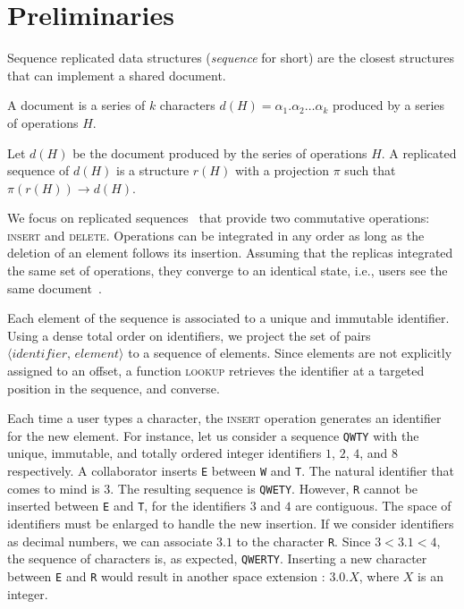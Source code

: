 
\section{Preliminaries}
\label{sec:preliminaries}

Sequence replicated data structures (\emph{sequence} for short) are the closest
structures that can implement a shared document. 

\begin{definition}[Document]
  A document is a series of $k$ characters
  $d(H) = \alpha_1.\alpha_2\ldots \alpha_k$ produced by a series of operations
  $H$.
\end{definition}

\begin{definition}
  Let $d(H)$ be the document produced by the series of operations $H$. A replicated
  sequence of $d(H)$ is a structure $r(H)$ with a projection $\pi$ such that
  $\pi(r(H)) \rightarrow d(H)$.
\end{definition}

We focus on replicated sequences~\cite{shapiro2011comprehensive,
  shapiro2011conflict} that provide two commutative operations:
\textsc{insert} and \textsc{delete}. Operations can be integrated in
any order as long as the deletion of an element follows its
insertion. Assuming that the replicas integrated the same set of
operations, they converge to an identical state, i.e., users see the
same document~\cite{shapiro2011conflict}.

\noindent Each element of the sequence is associated to a unique and immutable
identifier. Using a dense total order on identifiers, we project the set of
pairs $\langle identifier,\, element \rangle$ to a sequence of elements. Since
elements are not explicitly assigned to an offset, a function \textsc{lookup}
retrieves the identifier at a targeted position in the sequence, and converse.

Each time a user types a character, the \textsc{insert} operation generates an
identifier for the new element.  For instance, let us consider a sequence
\texttt{QWTY} with the unique, immutable, and totally ordered integer
identifiers $1$, $2$, $4$, and $8$ respectively. A collaborator inserts
\texttt{E} between \texttt{W} and \texttt{T}. The natural identifier that comes
to mind is $3$. The resulting sequence is \texttt{QWETY}. However, \texttt{R}
cannot be inserted between \texttt{E} and \texttt{T}, for the identifiers $3$
and $4$ are contiguous. The space of identifiers must be enlarged to handle the
new insertion. If we consider identifiers as decimal numbers, we can associate
$3.1$ to the character \texttt{R}. Since $3 < 3.1 < 4$, the sequence of
characters is, as expected, \texttt{QWERTY}. Inserting a new character between
\texttt{E} and \texttt{R} would result in another space extension : $3.0.X$,
where $X$ is an integer.

